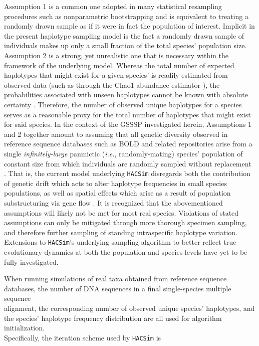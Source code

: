 \noindent Assumption 1 is a common one adopted in many statistical resampling procedures such as nonparametric bootstrapping and is equivalent to treating a randomly drawn sample as if it were in fact the population of interest. Implicit in the present haplotype sampling model is the fact a randomly drawn sample of individuals makes up only a small fraction of the total species' population size. Assumption 2 is a strong, yet unrealistic one that is necessary within the framework of the underlying model. Whereas the total number of expected haplotypes that might exist for a given species' is readily estimated from observed data (such as through the Chao1 abundance estimator \cite{chao1984nonparametric}), the probabilities associated with unseen haplotypes cannot be known with absolute certainty \cite{phillips2020hacsim}. Therefore, the number of observed unique haplotypes for a species serves as a reasonable proxy for the total number of haplotypes that might exist for said species. In the context of the GSSSP investigated herein, Assumptions 1 and 2 together amount to assuming that all genetic diversity observed in reference sequence databases such as BOLD and related repositories arise from a single \textit{infinitely-large} panmictic (\textit{i.e.}, randomly-mating) species' population of constant size from which individuals are randomly sampled without replacement \\ \cite{phillips2015exploration}. That is, the current model underlying {\tt HACSim} disregards both the contribution of genetic drift which acts to alter haplotype frequencies in small species populations, as well as spatial effects which arise as a result of population substructuring via gene flow \cite{phillips2019incomplete}. It is recognized that the abovementioned assumptions will likely not be met for most real species. Violations of stated assumptions can only be mitigated through more thorough specimen sampling, and therefore further sampling of standing intraspecific haplotype variation. Extensions to {\tt HACSim}'s underlying sampling algorithm to better reflect true evolutionary dynamics at both the population and species levels have yet to be fully investigated.

When running simulations of real taxa obtained from reference sequence databases, the number of DNA sequences in a final single-species multiple sequence \\ alignment, the corresponding number of observed unique species' haplotypes, and the species' haplotype frequency distribution are all used for algorithm initialization. \\ Specifically, the iteration scheme used by {\tt HACSim} is

